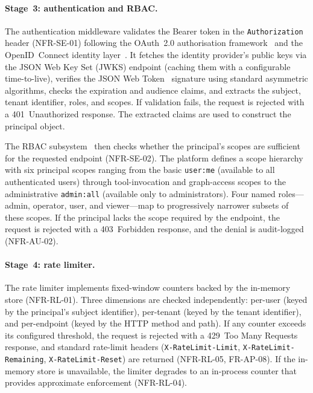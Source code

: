\documentclass[a4paper]{sapthesis}
\begin{document}
\paragraph{Stage~3: authentication and RBAC.}
The authentication middleware validates the Bearer token in the
\texttt{Authorization} header (NFR-SE-01) following the OAuth~2.0
authorisation framework~\cite{rfc6749oauth2} and the OpenID~Connect
identity layer~\cite{oidc2014}.  It fetches the identity provider's
public keys via the JSON Web Key Set (JWKS) endpoint (caching them with
a configurable time-to-live), verifies the JSON Web
Token~\cite{rfc7519jwt} signature using standard asymmetric algorithms,
checks the expiration and audience claims, and extracts the subject,
tenant identifier, roles, and scopes.  If validation fails, the request is
rejected with a 401~Unauthorized response.  The extracted claims are used
to construct the principal object.

The RBAC subsystem~\cite{nist2004rbac} then checks whether the
principal's scopes are sufficient for the requested endpoint
(NFR-SE-02).  The platform defines a scope hierarchy with six principal
scopes ranging from the basic
\texttt{user:me} (available to all authenticated users) through
tool-invocation and graph-access scopes to the administrative
\texttt{admin:all} (available only to administrators).  Four named
roles---admin, operator, user, and viewer---map to progressively
narrower subsets of these scopes.  If the principal lacks the scope
required by the endpoint, the request is rejected with a 403~Forbidden
response, and the denial is audit-logged (NFR-AU-02).

\paragraph{Stage~4: rate limiter.}
The rate limiter implements fixed-window counters backed by the in-memory
store (NFR-RL-01).  Three dimensions are checked independently: per-user
(keyed by the principal's subject identifier), per-tenant (keyed by the
tenant identifier), and per-endpoint (keyed by the HTTP method and path).
If any counter exceeds its configured threshold, the request is rejected
with a 429~Too Many Requests response, and standard rate-limit headers
(\texttt{X-RateLimit-Limit}, \texttt{X-RateLimit-Remaining},
\texttt{X-RateLimit-Reset}) are returned (NFR-RL-05, FR-AP-08).  If the
in-memory store is unavailable, the limiter degrades to an in-process
counter that provides approximate enforcement (NFR-RL-04).
\end{document}
